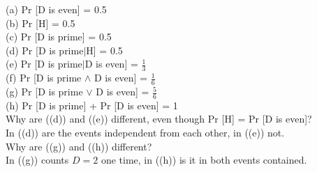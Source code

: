 \documentclass[12pt,a4paper]{article}
\begin{document}
 \exercise
(a) Pr [D is even] = 0.5\\
(b) Pr [H] = 0.5\\
(c) Pr [D is prime] = 0.5\\
(d) Pr [D is prime\(\vert\)H] = 0.5\\
(e) Pr [D is prime\(\vert\)D is even] = \(\frac{1}{3}\)\\
(f) Pr [D is prime \(\land \) D is even] = \(\frac{1}{6}\) \\
(g) Pr [D is prime \(\lor \) D is even] = \(\frac{5}{6}\) \\
(h) Pr [D is prime] + Pr [D is even] = 1\\
Why are ((d)) and ((e)) different, even though Pr [H] = Pr [D is even]?\\
\indent In ((d)) are the events independent from each other, in ((e)) not.\\
Why are ((g)) and ((h)) different?\\
\indent In ((g)) counts \(D=2\) one time, in ((h)) is it in both events contained.

%  
%
%
%  
%
%  
%	
%
%
%
%
%
%
%
%
%
%
\end{document}

